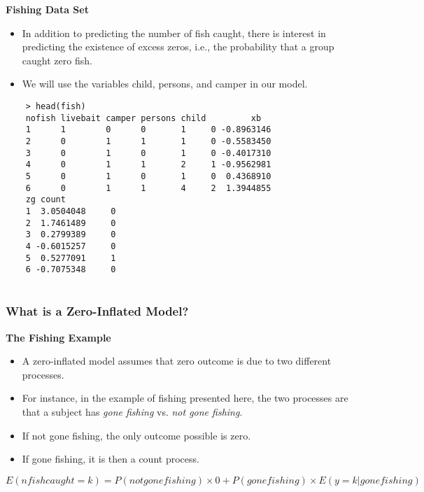 \documentclass[MASTER.tex]{subfiles}
\begin{document}
\begin{frame}
	\textbf{Fishing Data Set}
	\begin{itemize}
	\item In addition to predicting the number of fish caught, there is interest in predicting the existence of excess zeros, i.e., the probability that a group caught zero fish. 
	\item We will use the variables child, persons, and camper in our model.
	\end{itemize}
\end{frame}
\begin{frame}[fragile]
	\begin{verbatim}
	> head(fish)
	nofish livebait camper persons child         xb
	1      1        0      0       1     0 -0.8963146
	2      0        1      1       1     0 -0.5583450
	3      0        1      0       1     0 -0.4017310
	4      0        1      1       2     1 -0.9562981
	5      0        1      0       1     0  0.4368910
	6      0        1      1       4     2  1.3944855
	zg count
	1  3.0504048     0
	2  1.7461489     0
	3  0.2799389     0
	4 -0.6015257     0
	5  0.5277091     1
	6 -0.7075348     0
	
	\end{verbatim}
\end{frame}
\begin{frame}
\frametitle{What is a Zero-Inflated Model?}
\textbf{The Fishing Example}
\begin{itemize}
\item A zero-inflated model assumes that zero outcome is due to two different processes.

\item For instance, in the example of fishing presented here, the two processes are that a subject has \textit{gone fishing} vs. \textit{not gone fishing}.
\item If not gone fishing, the only outcome possible is zero. 
\item If gone fishing, it is then a count process. 
\end{itemize}
\[E(n fish caught =k)=P(not gone fishing)\times 0+P(gone fishing) \times E(y=k|gone fishing) \]
\end{frame}
 
\end{document}

